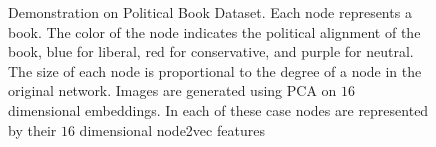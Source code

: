 \documentclass{article}
\theoremstyle{plain}
\theoremstyle{definition}
\theoremstyle{remark}
\begin{document}
\begin{figure}[t!]
%
\qquad
{}%


    \caption{Demonstration on Political Book Dataset. Each node represents a book. The color of the node indicates the political alignment of the book, blue for liberal, red for conservative, and purple for neutral. The size of each node is proportional to the degree of a node in the original network. Images are generated using PCA on $16$ dimensional embeddings. In each of these case nodes are represented by their $16$ dimensional node2vec features}
    \label{fig:polbook-demonstration-appendix}
\end{figure}
\end{document}
